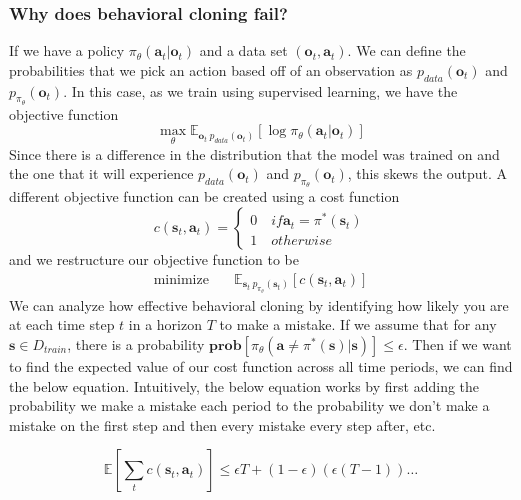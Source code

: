 \subsubsection{Why does behavioral cloning fail?}
If we have a policy $\pi_\theta( \textbf{a}_t | \textbf{o}_t)$ and a data set $(\textbf{o}_t, \textbf{a}_t)$. We can define the probabilities that we pick an action based off of an observation as $p_{data}(\textbf{o}_t)$ and $p_{\pi_\theta} (\textbf{o}_t)$. In this case, as we train using supervised learning, we have the objective function 
\begin{equation}
     \max_\theta \mathbb{E}_{\textbf{o}_t ~ p_{data}(\textbf{o}_t)} [\log \pi_\theta(\textbf{a}_t | \textbf{o}_t)]
\end{equation}
Since there is a difference in the distribution that the model was trained on and the one that it will experience $p_{data}(\textbf{o}_t)$ and $p_{\pi_\theta} (\textbf{o}_t)$, this skews the output. A different objective function can be created using a cost function
\begin{equation}
    c(\textbf{s}_t, \textbf{a}_t) = 
    \begin{cases}
        0 \quad if \textbf{a}_t = \pi^*(\textbf{s}_t)\\ 
        1 \quad otherwise
    \end{cases}
\end{equation}
and we restructure our objective function to be
\begin{align}
  \text{minimize} & \quad \mathbb{E}_{\textbf{s}_t ~ p_{\pi_\theta}(\textbf{s}_t)} [c(\textbf{s}_t, \textbf{a}_t)]
\end{align}
We can analyze how effective behavioral cloning by identifying how likely you are at each time step $t$ in a horizon $T$ to make a mistake. If we assume that for any $\textbf{s} \in D_{train}$, there is a probability $\textbf{prob} [\pi_\theta(\textbf{a} \neq \pi^* (\textbf{s}) | \textbf{s})] \leq \epsilon$. Then if we want to find the expected value of our cost function across all time periods, we can find the below equation. Intuitively, the below equation works by first adding the probability we make a mistake each period to the probability we don't make a mistake on the first step and then every mistake every step after, etc.

\begin{equation}
    \mathbb{E}[\sum_{t} c(\textbf{s}_t, \textbf{a}_t)] \leq \epsilon T + (1-\epsilon)(\epsilon(T-1)) \dots 
\end{equation}

